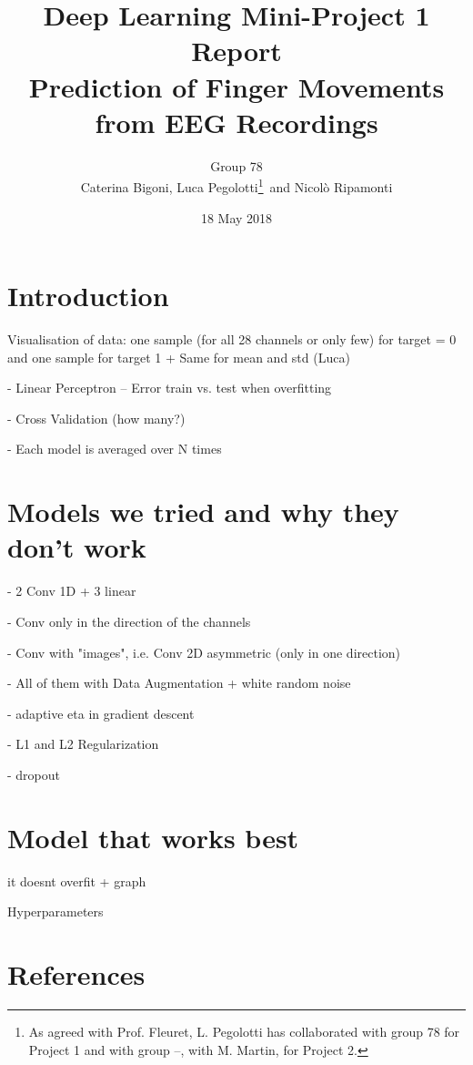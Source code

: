 \documentclass{article}
\begin{document}
\title{Deep Learning Mini-Project 1 Report \\ Prediction of Finger Movements from EEG Recordings}
\author{Group 78\\ Caterina Bigoni, Luca Pegolotti\footnote{As agreed with Prof. Fleuret, L. Pegolotti has collaborated with group 78 for Project 1 and with group --, with M. Martin, for Project 2.} \,and Nicol\`o Ripamonti}
\date{18 May 2018}
\maketitle





\section{Introduction}
 
 
 Visualisation of data: one sample (for all 28 channels or only few) for target = 0 and one sample for target 1
 + Same for mean and std (Luca)
 
 - Linear Perceptron --  Error train vs. test when overfitting 
 
 
 - Cross Validation (how many?)
 
 - Each model is averaged over N times 
 
 \section{Models we tried and why they don't work}

 
 - 2 Conv 1D + 3 linear 
 
 - Conv only in the direction of the channels \cite{zheng2014time}
 
 - Conv with "images", i.e. Conv 2D asymmetric (only in one direction) \cite{schirrmeister2017deep}
 
 - All of them with Data Augmentation + white random noise \cite{wang2018data}
 
 -  adaptive eta in gradient descent 
 
 - L1 and L2 Regularization \cite{goodfellow2016deep} 
 
 - dropout 
 
 
 
  \section{Model that works best}
 
 it doesnt overfit + graph
 
 
 Hyperparameters 
 
 
 
\section{References}

 
  
  
  
\end{document}
